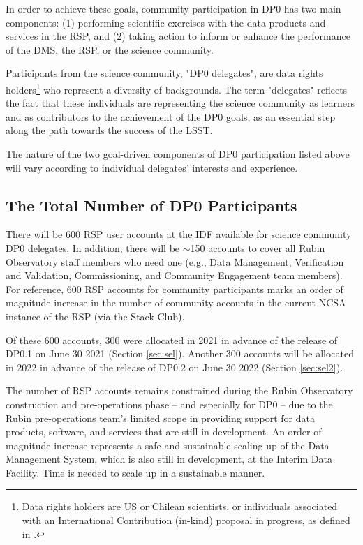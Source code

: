 \documentclass[DM,lsstdraft,authoryear,toc]{lsstdoc}
\begin{document}
In order to achieve these goals, community participation in DP0 has two main components:
(1) performing scientific exercises with the data products and services in the RSP, and
(2) taking action to inform or enhance the performance of the DMS, the RSP, or the science community.

Participants from the science community, "DP0 delegates", are data rights holders\footnote{Data rights holders are US or Chilean scientists, or individuals associated with an International Contribution (in-kind) proposal in progress, as defined in .} who represent a diversity of backgrounds.
The term "delegates" reflects the fact that these individuals are representing the science community as learners and as contributors to the achievement of the DP0 goals, as an essential step along the path towards the success of the LSST. 

The nature of the two goal-driven components of DP0 participation listed above will vary according to individual delegates' interests and experience.

\subsection{The Total Number of DP0 Participants}

There will be 600 RSP user accounts at the IDF available for science community DP0 delegates.
In addition, there will be $\sim$150 accounts to cover all Rubin Observatory staff members who need one (e.g., Data Management, Verification and Validation, Commissioning, and Community Engagement team members).
For reference, 600 RSP accounts for community participants marks an order of magnitude increase in the number of community accounts in the current NCSA instance of the RSP (via the Stack Club).

Of these 600 accounts, 300 were allocated in 2021 in advance of the release of DP0.1 on June 30 2021 (Section \ref{sec:sel}).
Another 300 accounts will be allocated in 2022 in advance of the release of DP0.2 on June 30 2022 (Section \ref{sec:sel2}).

The number of RSP accounts remains constrained during the Rubin Observatory construction and pre-operations phase -- and especially for DP0 -- due to the Rubin pre-operations team's limited scope in providing support for data products, software, and services that are still in development.
An order of magnitude increase represents a safe and sustainable scaling up of the Data Management System, which is also still in development, at the Interim Data Facility.
Time is needed to scale up in a sustainable manner.
\end{document}
